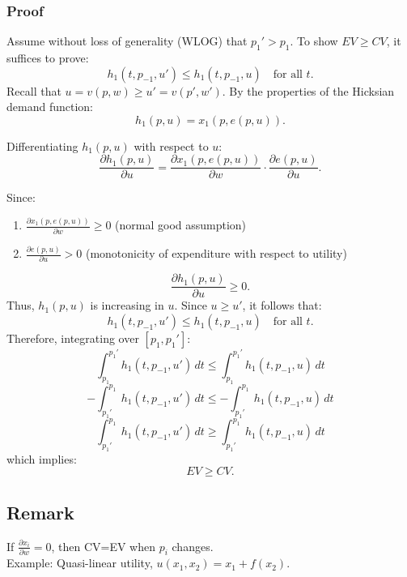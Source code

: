 \documentclass{article}
\begin{document}
\subsubsection*{Proof}
Assume without loss of generality (WLOG) that \(p_1' > p_1\).  
To show \(EV \geq CV\), it suffices to prove:
\[
h_1(t, p_{-1}, u') \leq h_1(t, p_{-1}, u) \quad \text{for all } t.
\]
Recall that \(u = v(p, w) \geq u' = v(p', w')\). By the properties of the Hicksian demand function:
\[
h_1(p, u) = x_1(p, e(p, u)).
\]

Differentiating \(h_1(p, u)\) with respect to \(u\):
\[
\frac{\partial h_1(p, u)}{\partial u} = \frac{\partial x_1(p, e(p, u))}{\partial w} \cdot \frac{\partial e(p, u)}{\partial u}.
\]

Since:
\begin{enumerate}
    \item \(\frac{\partial x_1(p, e(p, u))}{\partial w} \geq 0\) (normal good assumption)
    \item \(\frac{\partial e(p, u)}{\partial u} > 0\) (monotonicity of expenditure with respect to utility)
\end{enumerate}
\[
\frac{\partial h_1(p, u)}{\partial u} \geq 0.
\]
Thus, \(h_1(p, u)\) is increasing in \(u\). Since \(u \geq u'\), it follows that:
\[
h_1(t, p_{-1}, u') \leq h_1(t, p_{-1}, u) \quad \text{for all } t.
\]
Therefore, integrating over \([p_1, p_1']\):
\[
\int_{p_1}^{p_1'} h_1(t, p_{-1}, u') \, dt \leq \int_{p_1}^{p_1'} h_1(t, p_{-1}, u) \, dt
\]
\[
-\int_{p_1'}^{p_1} h_1(t, p_{-1}, u') \, dt \leq -\int_{p_1'}^{p_1} h_1(t, p_{-1}, u) \, dt
\]
\[
\int_{p_1'}^{p_1} h_1(t, p_{-1}, u') \, dt \geq \int_{p_1'}^{p_1} h_1(t, p_{-1}, u) \, dt
\]
which implies:
\[
EV \geq CV.
\]

\subsection*{Remark}
If $\frac{\partial x_i}{\partial w} = 0$, then CV=EV when $p_i$ changes.\\
Example: Quasi-linear utility, $u(x_1,x_2) = x_1 +f(x_2)$.
\end{document}
